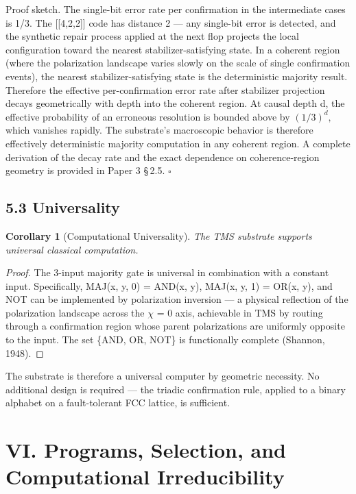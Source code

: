 \documentclass[11pt,oneside]{report}
\newtheorem{corollary}[theorem]{Corollary}
\theoremstyle{definition}
\theoremstyle{remark}
\begin{document}
Proof sketch. The single-bit error rate per confirmation in the
intermediate cases is 1/3. The [[4,2,2]] code has distance 2 ---
any single-bit error is detected, and the synthetic repair process
applied at the next flop projects the local configuration toward the
nearest stabilizer-satisfying state. In a coherent region (where the
polarization landscape varies slowly on the scale of single confirmation
events), the nearest stabilizer-satisfying state is the deterministic
majority result. Therefore the effective per-confirmation error rate
after stabilizer projection decays geometrically with depth into the
coherent region. At causal depth d, the effective probability of an
erroneous resolution is bounded above by \ensuremath{(1/3)^{d},} which vanishes
rapidly. The substrate's macroscopic behavior is therefore effectively
deterministic majority computation in any coherent region. A complete
derivation of the decay rate and the exact dependence on
coherence-region geometry is provided in Paper 3 \S\,2.5. \hfill\ensuremath{\square}

\subsection*{5.3 Universality}

\begin{corollary}[Computational Universality]
The TMS substrate supports
universal classical computation.
\end{corollary}

\begin{proof}
The 3-input majority gate is universal in combination with a
constant input. Specifically, MAJ(x, y, 0) = AND(x, y), MAJ(x, y, 1) =
OR(x, y), and NOT can be implemented by polarization inversion --- a
physical reflection of the polarization landscape across the \ensuremath{\chi} = 0 axis,
achievable in TMS by routing through a confirmation region whose parent
polarizations are uniformly opposite to the input. The set \{AND, OR,
NOT\} is functionally complete (Shannon, 1948).

\end{proof}

The substrate is therefore a universal computer by geometric necessity.
No additional design is required --- the triadic confirmation rule,
applied to a binary alphabet on a fault-tolerant FCC lattice, is
sufficient.

\section*{VI. Programs, Selection, and Computational Irreducibility}
\end{document}
